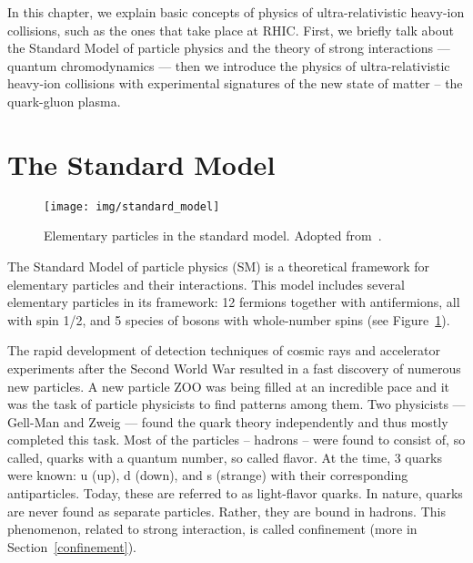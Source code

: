 In this chapter, we explain basic concepts of physics of ultra-relativistic heavy-ion collisions, such as the ones that take place at RHIC\@. First, we briefly talk about the Standard Model of particle physics and the theory of strong interactions --- quantum chromodynamics --- then we introduce the physics of ultra-relativistic heavy-ion collisions with experimental signatures of the new state of matter -- the quark-gluon plasma. 

\section{The Standard Model}

\begin{figure}[!htb]
\centering
\texttt{[image: img/standard\_model]}
\caption[Elementary particles in the standard model.]{\label{standard_model}Elementary particles in the standard model. Adopted from~\cite{standardModel}\@.}
\end{figure}

The Standard Model of particle physics (SM) is a theoretical framework for elementary particles and their interactions. This model includes several elementary particles in its framework: 12 fermions together with antifermions, all with spin 1/2, and 5 species of bosons with whole-number spins (see Figure~\ref{standard_model})\@.

The rapid development of detection techniques of cosmic rays and accelerator experiments after the Second World War resulted in a fast discovery of numerous new particles. A new particle ZOO was being filled at an incredible pace and it was the task of particle physicists to find patterns among them. Two physicists --- Gell-Man and Zweig --- found the quark theory independently and thus mostly completed this task. Most of the particles -- hadrons -- were found to consist of, so called, quarks with a quantum number, so called flavor. At the time, 3 quarks were known: u (up), d (down), and s (strange) with their corresponding antiparticles. Today, these are referred to as light-flavor quarks. In nature, quarks are never found as separate particles. Rather, they are bound in hadrons. This phenomenon, related to strong interaction, is called confinement (more in Section~\ref{confinement})\@.

